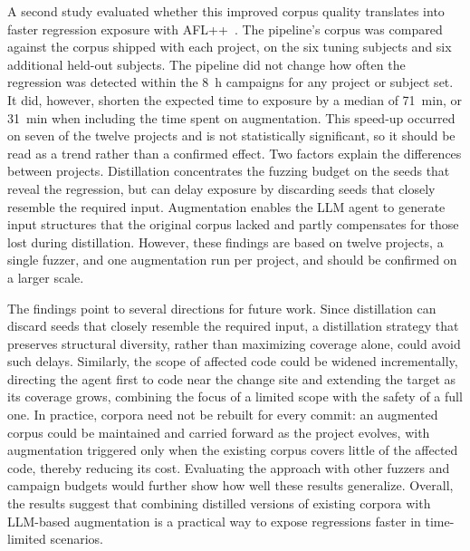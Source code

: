 A second study evaluated whether this improved corpus quality translates into faster regression exposure with AFL++~\cite{serebryanyOSSFuzzGooglesContinuous2017}.
The pipeline's corpus was compared against the corpus shipped with each project, on the six tuning subjects and six additional held-out subjects.
The pipeline did not change how often the regression was detected within the \SI{8}{\hour} campaigns for any project or subject set.
It did, however, shorten the expected time to exposure by a median of \SI{71}{\minute}, or \SI{31}{\minute} when including the time spent on augmentation.
This speed-up occurred on seven of the twelve projects and is not statistically significant, so it should be read as a trend rather than a confirmed effect.
Two factors explain the differences between projects.
Distillation concentrates the fuzzing budget on the seeds that reveal the regression, but can delay exposure by discarding seeds that closely resemble the required input.
Augmentation enables the \ac{LLM} agent to generate input structures that the original corpus lacked and partly compensates for those lost during distillation. However, these findings are based on twelve projects, a single fuzzer, and one augmentation run per project, and should be confirmed on a larger scale.

The findings point to several directions for future work.
Since distillation can discard seeds that closely resemble the required input, a distillation strategy that preserves structural diversity, rather than maximizing coverage alone, could avoid such delays.
Similarly, the scope of affected code could be widened incrementally, directing the agent first to code near the change site and extending the target as its coverage grows, combining the focus of a limited scope with the safety of a full one.
In practice, corpora need not be rebuilt for every commit: an augmented corpus could be maintained and carried forward as the project evolves, with augmentation triggered only when the existing corpus covers little of the affected code, thereby reducing its cost.
Evaluating the approach with other fuzzers and campaign budgets would further show how well these results generalize.
Overall, the results suggest that combining distilled versions of existing corpora with \ac{LLM}-based augmentation is a practical way to expose regressions faster in time-limited scenarios.
